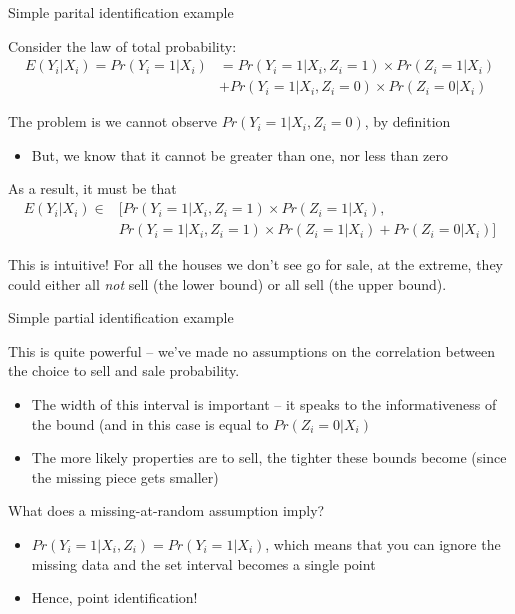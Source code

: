 \documentclass[notes,11pt, aspectratio=169]{beamer}
\newenvironment{wideitemize}{\itemize\addtolength{\itemsep}{10pt}}{\enditemize}
\begin{document}
\begin{frame}{Simple parital identification example}
  \begin{wideitemize}
  \item Consider the law of total probability:
    \begin{align*}
      E(Y_{i} | X_{i} ) = Pr(Y_{i} = 1 |X_{i}) &= Pr(Y_{i} = 1 | X_{i}, Z_{i} = 1)  \times Pr(Z_{i} = 1 | X_{i}) \\
      & + Pr(Y_{i} = 1 | X_{i}, Z_{i} = 0)  \times Pr(Z_{i} = 0 | X_{i}) 
    \end{align*}
  \item The problem is we cannot observe $Pr(Y_{i} = 1 | X_{i}, Z_{i} = 0)$, by definition
    \begin{itemize}
    \item But, we know that it cannot be greater than one, nor less than zero
    \end{itemize}
  \item As a result, it must be that
    \begin{align*}
      E(Y_{i} | X_{i} ) \in &  [Pr(Y_{i} = 1 | X_{i}, Z_{i} = 1)  \times Pr(Z_{i} = 1 | X_{i}), \\
      & Pr(Y_{i} = 1 | X_{i}, Z_{i} = 1)  \times Pr(Z_{i} = 1 | X_{i}) + Pr(Z_{i} = 0 | X_{i})]
    \end{align*}
  \item This is intuitive! For all the houses we don't see go for
    sale, at the extreme, they could either all \emph{not} sell (the
    lower bound) or all sell (the upper bound). 
  \end{wideitemize}
\end{frame}

\begin{frame}{Simple partial identification example}
  \begin{wideitemize}
  \item This is quite powerful -- we've made no assumptions on the
    correlation between the choice to sell and sale probability.
    \begin{itemize}
    \item The width of this interval is important -- it speaks to the
      informativeness of the bound (and in this case is equal to
      $Pr(Z_{i} = 0 | X_{i})$
    \item The more likely properties are to sell, the tighter these
      bounds become (since the missing piece gets smaller)
    \end{itemize}
  \item What does a missing-at-random assumption imply?
    \begin{itemize}
    \item $Pr(Y_{i} = 1 | X_{i}, Z_{i} ) = Pr(Y_{i} = 1 | X_{i})$,
      which means that you can ignore the missing data and the set
      interval becomes a single point
    \item Hence, point identification!
    \end{itemize}
  \end{wideitemize}
\end{frame}
\end{document}
